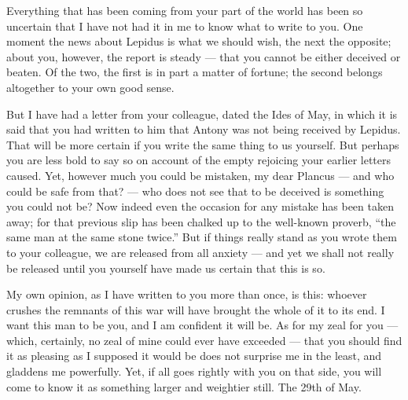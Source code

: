 

 Everything that has been coming from your part of the world has been so uncertain that I have not had it in me to know what to write to you. One moment the news about Lepidus is what we should wish, the next the opposite; about you, however, the report is steady --- that you cannot be either deceived or beaten. Of the two, the first is in part a matter of fortune; the second belongs altogether to your own good sense.

 But I have had a letter from your colleague, dated the Ides of May, in which it is said that you had written to him that Antony was not being received by Lepidus. That will be more certain if you write the same thing to us yourself. But perhaps you are less bold to say so on account of the empty rejoicing your earlier letters caused. Yet, however much you could be mistaken, my dear Plancus --- and who could be safe from that? --- who does not see that to be deceived is something you could not be? Now indeed even the occasion for any mistake has been taken away; for that previous slip has been chalked up to the well-known proverb, ``the same man at the same stone twice.'' But if things really stand as you wrote them to your colleague, we are released from all anxiety --- and yet we shall not really be released until you yourself have made us certain that this is so.

 My own opinion, as I have written to you more than once, is this: whoever crushes the remnants of this war will have brought the whole of it to its end. I want this man to be you, and I am confident it will be. As for my zeal for you --- which, certainly, no zeal of mine could ever have exceeded --- that you should find it as pleasing as I supposed it would be does not surprise me in the least, and gladdens me powerfully. Yet, if all goes rightly with you on that side, you will come to know it as something larger and weightier still. The 29th of May.

